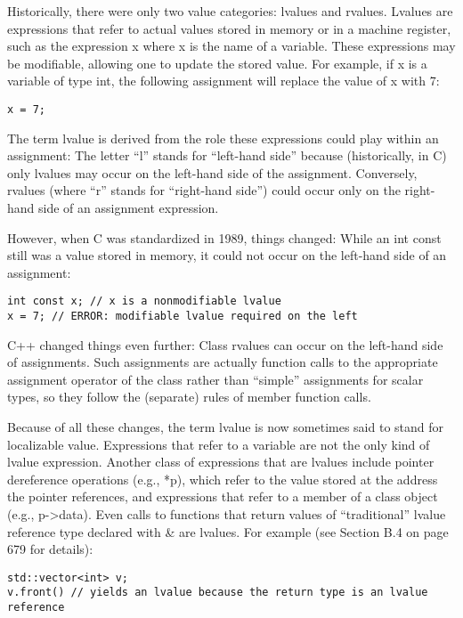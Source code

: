 
Historically, there were only two value categories: lvalues and rvalues. Lvalues are expressions that refer to actual values stored in memory or in a machine register, such as the expression x where x is the name of a variable. These expressions may be modifiable, allowing one to update the stored value. For example, if x is a variable of type int, the following assignment will replace the value of x with 7:

\begin{lstlisting}[style=styleCXX]
x = 7;
\end{lstlisting}

The term lvalue is derived from the role these expressions could play within an assignment: The letter “l” stands for “left-hand side” because (historically, in C) only lvalues may occur on the left-hand side of the assignment. Conversely, rvalues (where “r” stands for “right-hand side”) could occur only on the right-hand side of an assignment expression. 

However, when C was standardized in 1989, things changed: While an int const still was a value stored in memory, it could not occur on the left-hand side of an assignment:

\begin{lstlisting}[style=styleCXX]
int const x; // x is a nonmodifiable lvalue
x = 7; // ERROR: modifiable lvalue required on the left
\end{lstlisting}

C++ changed things even further: Class rvalues can occur on the left-hand side of assignments. Such assignments are actually function calls to the appropriate assignment operator of the class rather than “simple” assignments for scalar types, so they follow the (separate) rules of member function calls.

Because of all these changes, the term lvalue is now sometimes said to stand for localizable value. Expressions that refer to a variable are not the only kind of lvalue expression. Another class of expressions that are lvalues include pointer dereference operations (e.g., *p), which refer to the value stored at the address the pointer references, and expressions that refer to a member of a class object (e.g., p->data). Even calls to functions that return values of “traditional” lvalue reference type declared with \& are lvalues. For example (see Section B.4 on page 679 for details):

\begin{lstlisting}[style=styleCXX]
std::vector<int> v;
v.front() // yields an lvalue because the return type is an lvalue reference
\end{lstlisting}

